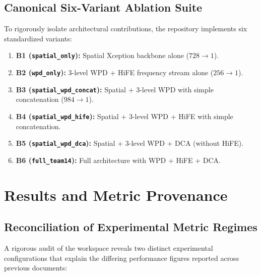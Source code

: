 \documentclass[11pt,a4paper]{article}
\begin{document}
\subsection{Canonical Six-Variant Ablation Suite}
To rigorously isolate architectural contributions, the repository implements six standardized variants:
\begin{enumerate}
    \item \textbf{B1 (\texttt{spatial\_only}):} Spatial Xception backbone alone ($728 \to 1$).
    \item \textbf{B2 (\texttt{wpd\_only}):} 3-level WPD + HiFE frequency stream alone ($256 \to 1$).
    \item \textbf{B3 (\texttt{spatial\_wpd\_concat}):} Spatial + 3-level WPD with simple concatenation ($984 \to 1$).
    \item \textbf{B4 (\texttt{spatial\_wpd\_hife}):} Spatial + 3-level WPD + HiFE with simple concatenation.
    \item \textbf{B5 (\texttt{spatial\_wpd\_dca}):} Spatial + 3-level WPD + DCA (without HiFE).
    \item \textbf{B6 (\texttt{full\_team14}):} Full architecture with WPD + HiFE + DCA.
\end{enumerate}

\section{Results and Metric Provenance}
\label{sec:results}

\subsection{Reconciliation of Experimental Metric Regimes}
A rigorous audit of the workspace reveals two distinct experimental configurations that explain the differing performance figures reported across previous documents:
\end{document}
